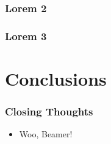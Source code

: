 \documentclass[aspectratio=169]{beamer}
\begin{document}
		\begin{frame}
			\frametitle{Lorem 2}
			\blindtext
		\end{frame}

		\begin{frame}
			\frametitle{Lorem 3}
			\blindtext
		\end{frame}

	\section{Conclusions}
		\begin{frame}
			\frametitle{Closing Thoughts}
			\begin{itemize}
				\item Woo, Beamer!
			\end{itemize}
		\end{frame}
\end{document}
